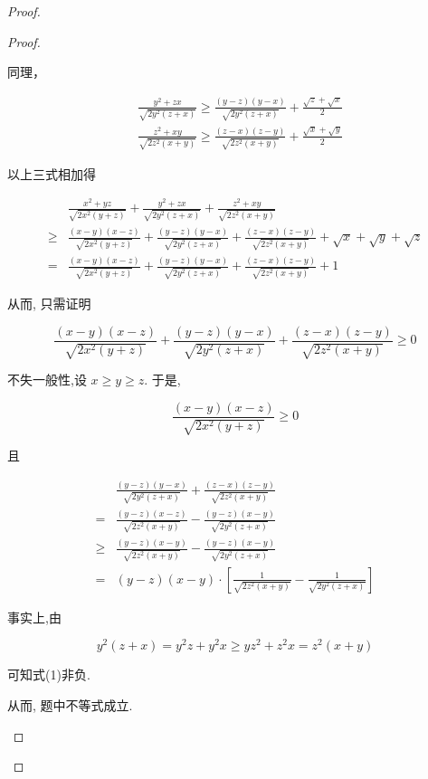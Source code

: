 \begin{proof}
\begin{example}
\begin{solution}
\begin{note}
\begin{solution}
\begin{proof}
\begin{example}
	同理，
	
	$$
	\begin{aligned}
	& \frac{y^{2}+z x}{\sqrt{2 y^{2}(z+x)}} \geqslant \frac{(y-z)(y-x)}{\sqrt{2 y^{2}(z+x)}}+\frac{\sqrt{z}+\sqrt{x}}{2} \\
	& \frac{z^{2}+x y}{\sqrt{2 z^{2}(x+y)}} \geqslant \frac{(z-x)(z-y)}{\sqrt{2 z^{2}(x+y)}}+\frac{\sqrt{x}+\sqrt{y}}{2}
	\end{aligned}
	$$
	
	以上三式相加得
	
	$$
	\begin{aligned}
	& \frac{x^{2}+y z}{\sqrt{2 x^{2}(y+z)}}+\frac{y^{2}+z x}{\sqrt{2 y^{2}(z+x)}}+\frac{z^{2}+x y}{\sqrt{2 z^{2}(x+y)}} \\
	\geqslant & \frac{(x-y)(x-z)}{\sqrt{2 x^{2}(y+z)}}+\frac{(y-z)(y-x)}{\sqrt{2 y^{2}(z+x)}}+\frac{(z-x)(z-y)}{\sqrt{2 z^{2}(x+y)}}+\sqrt{x}+\sqrt{y}+\sqrt{z} \\
	= & \frac{(x-y)(x-z)}{\sqrt{2 x^{2}(y+z)}}+\frac{(y-z)(y-x)}{\sqrt{2 y^{2}(z+x)}}+\frac{(z-x)(z-y)}{\sqrt{2 z^{2}(x+y)}}+1
	\end{aligned}
	$$
	
	从而, 只需证明
	
	$$
	\frac{(x-y)(x-z)}{\sqrt{2 x^{2}(y+z)}}+\frac{(y-z)(y-x)}{\sqrt{2 y^{2}(z+x)}}+\frac{(z-x)(z-y)}{\sqrt{2 z^{2}(x+y)}} \geqslant 0
	$$
	
	不失一般性,设 $x \geqslant y \geqslant z$. 于是,
	
	$$
	\frac{(x-y)(x-z)}{\sqrt{2 x^{2}(y+z)}} \geqslant 0
	$$
	
	且
	
	
	\begin{align*}
	& \frac{(y-z)(y-x)}{\sqrt{2 y^{2}(z+x)}}+\frac{(z-x)(z-y)}{\sqrt{2 z^{2}(x+y)}} \\
	= & \frac{(y-z)(x-z)}{\sqrt{2 z^{2}(x+y)}}-\frac{(y-z)(x-y)}{\sqrt{2 y^{2}(z+x)}} \\
	\geqslant & \frac{(y-z)(x-y)}{\sqrt{2 z^{2}(x+y)}}-\frac{(y-z)(x-y)}{\sqrt{2 y^{2}(z+x)}} \\
	= & (y-z)(x-y) \cdot\left[\frac{1}{\sqrt{2 z^{2}(x+y)}}-\frac{1}{\sqrt{2 y^{2}(z+x)}}\right] \tag{1}
	\end{align*}
	
	
	事实上,由
	
	$$
	y^{2}(z+x)=y^{2} z+y^{2} x \geqslant y z^{2}+z^{2} x=z^{2}(x+y)
	$$
	
	可知式(1)非负.
	
	从而, 题中不等式成立.
	

\end{example}
\end{proof}
\end{solution}
\end{note}
\end{solution}
\end{example}
\end{proof}
